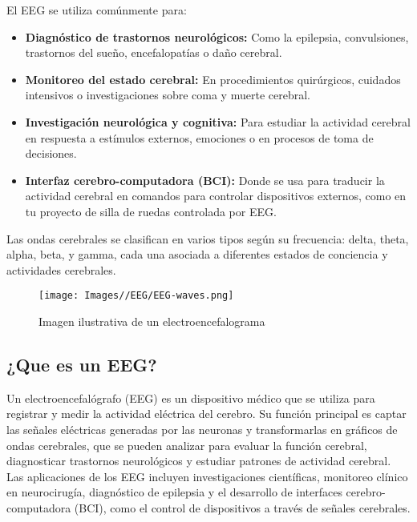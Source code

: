 \documentclass{article}
\begin{document}
El EEG se utiliza comúnmente para:
\begin{itemize}
    \item \textbf{Diagnóstico de trastornos neurológicos:} Como la epilepsia, convulsiones, trastornos del sueño, encefalopatías o daño cerebral.
    \item \textbf{Monitoreo del estado cerebral:} En procedimientos quirúrgicos, cuidados intensivos o investigaciones sobre coma y muerte cerebral.
    \item \textbf{Investigación neurológica y cognitiva:} Para estudiar la actividad cerebral en respuesta a estímulos externos, emociones o en procesos de toma de decisiones.
    \item \textbf{Interfaz cerebro-computadora (BCI):} Donde se usa para traducir la actividad cerebral en comandos para controlar dispositivos externos, como en tu proyecto de silla de ruedas controlada por EEG.
    
\end{itemize}

Las ondas cerebrales se clasifican en varios tipos según su frecuencia: delta, theta, alpha, beta, y gamma, cada una asociada a diferentes estados de conciencia y actividades cerebrales.

\begin{figure}[H]
    \centering
    \texttt{[image: Images//EEG/EEG-waves.png]}
    \caption{Imagen ilustrativa de un electroencefalograma}
    \label{fig:enter-label}
\end{figure}

\subsection{¿Que es un EEG?}
Un electroencefalógrafo (EEG) es un dispositivo médico que se utiliza para registrar y medir la actividad eléctrica del cerebro. Su función principal es captar las señales eléctricas generadas por las neuronas y transformarlas en gráficos de ondas cerebrales, que se pueden analizar para evaluar la función cerebral, diagnosticar trastornos neurológicos y estudiar patrones de actividad cerebral. Las aplicaciones de los EEG incluyen investigaciones científicas, monitoreo clínico en neurocirugía, diagnóstico de epilepsia y el desarrollo de interfaces cerebro-computadora (BCI), como el control de dispositivos a través de señales cerebrales.
\end{document}
